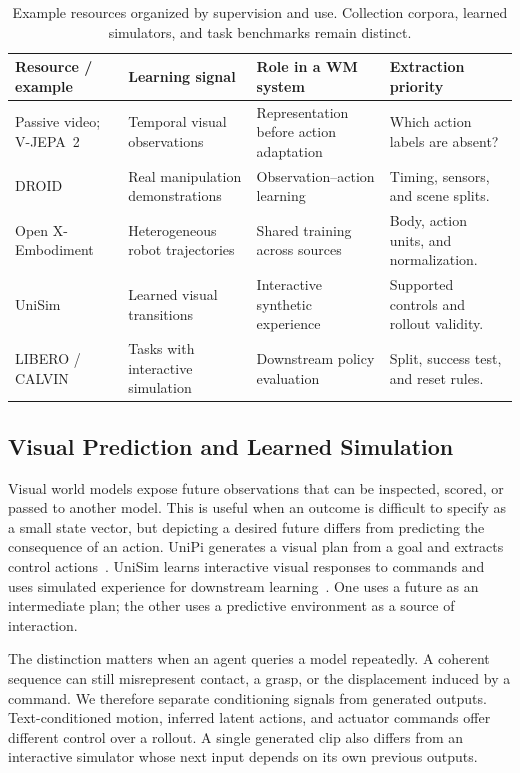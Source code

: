 \begin{table}[t]
\caption{Example resources organized by supervision and use. Collection corpora, learned simulators, and task benchmarks remain distinct.}
\label{tab:data-resources}
\small
\begin{tabularx}{\linewidth}{@{}>{\raggedright\arraybackslash}p{.19\linewidth}YYY@{}}
\toprule
Resource / example & Learning signal & Role in a WM system & Extraction priority \\
\midrule
Passive video; V-JEPA~2~\cite{assran2025vjepa2} & Temporal visual observations & Representation before action adaptation & Which action labels are absent? \\
\addlinespace
DROID~\cite{khazatsky2024droid} & Real manipulation demonstrations & Observation--action learning & Timing, sensors, and scene splits. \\
\addlinespace
Open X-Embodiment~\cite{oxe2024} & Heterogeneous robot trajectories & Shared training across sources & Body, action units, and normalization. \\
\addlinespace
UniSim~\cite{yang2024unisim} & Learned visual transitions & Interactive synthetic experience & Supported controls and rollout validity. \\
\addlinespace
LIBERO / CALVIN~\cite{liu2023libero,mees2022calvin} & Tasks with interactive simulation & Downstream policy evaluation & Split, success test, and reset rules. \\
\bottomrule
\end{tabularx}
\end{table}

\subsection{Visual Prediction and Learned Simulation}
Visual world models expose future observations that can be inspected, scored, or passed to another model. This is useful when an outcome is difficult to specify as a small state vector, but depicting a desired future differs from predicting the consequence of an action. UniPi generates a visual plan from a goal and extracts control actions~\cite{du2023unipi}. UniSim learns interactive visual responses to commands and uses simulated experience for downstream learning~\cite{yang2024unisim}. One uses a future as an intermediate plan; the other uses a predictive environment as a source of interaction.

The distinction matters when an agent queries a model repeatedly. A coherent sequence can still misrepresent contact, a grasp, or the displacement induced by a command. We therefore separate conditioning signals from generated outputs. Text-conditioned motion, inferred latent actions, and actuator commands offer different control over a rollout. A single generated clip also differs from an interactive simulator whose next input depends on its own previous outputs.

